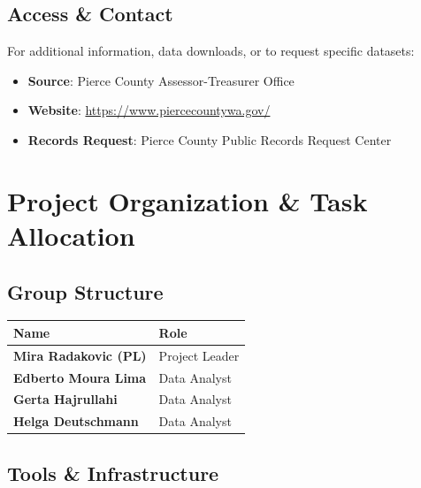 \documentclass[
  english,
  letterpaper,
  DIV=11,
  numbers=noendperiod]{scrreprt}
\newcounter{none} %
\providecommand{\tightlist}{%
  \setlength{\itemsep}{0pt}\setlength{\parskip}{0pt}}
\begin{document}
\section{Access \& Contact}\label{access-contact}

For additional information, data downloads, or to request specific
datasets:

\begin{itemize}
\tightlist
\item
  \textbf{Source}: Pierce County Assessor-Treasurer Office
\item
  \textbf{Website}: \url{https://www.piercecountywa.gov/}
\item
  \textbf{Records Request}: Pierce County Public Records Request Center
\end{itemize}


\chapter{Project Organization \& Task
Allocation}\label{project-organization-task-allocation}

\section{Group Structure}\label{group-structure}

{\def\LTcaptype{none} %
\begin{longtable}[]{@{}ll@{}}
\toprule\noalign{}
Name & Role \\
\midrule\noalign{}
\endhead
\bottomrule\noalign{}
\endlastfoot
\textbf{Mira Radakovic (PL)} & Project Leader \\
\textbf{Edberto Moura Lima} & Data Analyst \\
\textbf{Gerta Hajrullahi} & Data Analyst \\
\textbf{Helga Deutschmann} & Data Analyst \\
\end{longtable}
}

\section{Tools \& Infrastructure}\label{tools-infrastructure}
\end{document}
